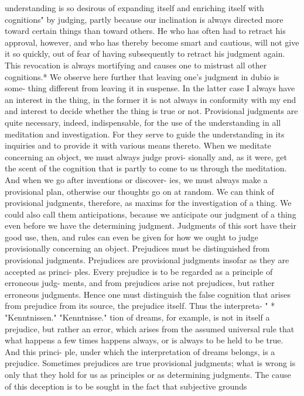 understanding is so desirous of expanding itself and enriching itself with
cognitions" by judging, partly because our inclination is always directed
more toward certain things than toward others. He who has often had to
retract his approval, however, and who has thereby become smart and
cautious, will not give it so quickly, out of fear of having subsequently to
retract his judgment again. This revocation is always mortifying and causes
one to mistrust all other cognitions.*
We observe here further that leaving one's judgment in dubio is some-
thing different from leaving it in suspense. In the latter case I always have
an interest in the thing, in the former it is not always in conformity with
my end and interest to decide whether the thing is true or not.
Provisional judgments are quite necessary, indeed, indispensable, for
the use of the understanding in all meditation and investigation. For they
serve to guide the understanding in its inquiries and to provide it with
various means thereto.
When we meditate concerning an object, we must always judge provi-
sionally and, as it were, get the scent of the cognition that is partly to come
to us through the meditation. And when we go after inventions or discover-
ies, we must always make a provisional plan, otherwise our thoughts go on
at random. We can think of provisional judgments, therefore, as maxims
for the investigation of a thing. We could also call them anticipations,
because we anticipate our judgment of a thing even before we have the
determining judgment. Judgments of this sort have their good use, then,
and rules can even be given for how we ought to judge provisionally
concerning an object.
Prejudices must be distinguished from provisional judgments.
Prejudices are provisional judgments insofar as they are accepted as princi-
ples. Every prejudice is to be regarded as a principle of erroneous judg-
ments, and from prejudices arise not prejudices, but rather erroneous
judgments. Hence one must distinguish the false cognition that arises
from prejudice from its source, the prejudice itself. Thus the interpreta-
"
*
"Kenntnissen."
"Kenntnisse."
tion of dreams, for example, is not in itself a prejudice, but rather an error,
which arises from the assumed universal rule that what happens a few
times happens always, or is always to be held to be true. And this princi-
ple, under which the interpretation of dreams belongs, is a prejudice.
Sometimes prejudices are true provisional judgments; what is wrong is
only that they hold for us as principles or as determining judgments. The
cause of this deception is to be sought in the fact that subjective grounds
